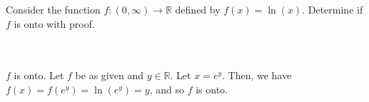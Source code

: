 Consider the function $f:(0,\infty)\rightarrow\mathbb{R}$ defined by $f(x)=\ln(x)$. Determine if $f$ is
onto with proof.\\\\

\begin{solution}\renewcommand{\qedsymbol}{}\ \\
    $f$ is onto. Let $f$ be as given and $y\in\mathbb{R}$. Let $x=e^y$. Then, we have
    $f(x)=f(e^y)=\ln(e^y)=y$, and so $f$ is onto.

\end{solution}